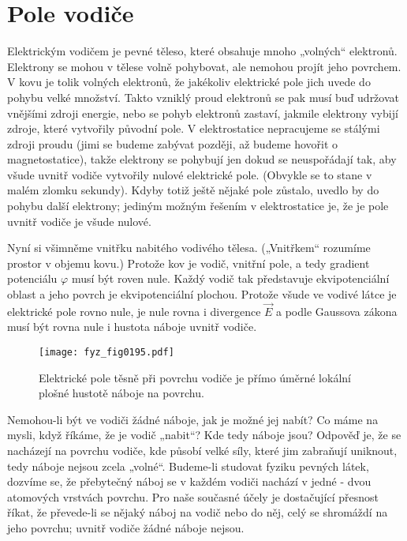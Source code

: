 \section{Pole vodiče}\label{fyz:IIchapVsecVIII}
  Elektrickým vodičem je pevné těleso, které obsahuje mnoho „volných“ elektronů. Elektrony se 
  mohou v tělese volně pohybovat, ale nemohou projít jeho povrchem. V kovu je tolik volných 
  elektronů, že jakékoliv elektrické pole jich uvede do pohybu velké množství. Takto vzniklý 
  proud elektronů se pak musí buď udržovat vnějšími zdroji energie, nebo se pohyb elektronů 
  zastaví, jakmile elektrony vybijí zdroje, které vytvořily původní pole. V elektrostatice 
  nepracujeme se stálými zdroji proudu (jimi se budeme zabývat později, až budeme hovořit o 
  magnetostatice), takže elektrony se pohybují jen dokud se neuspořádají tak, aby všude uvnitř 
  vodiče vytvořily nulové elektrické pole. (Obvykle se to stane v malém zlomku sekundy). Kdyby 
  totiž ještě nějaké pole zůstalo, uvedlo by do pohybu další elektrony; jediným možným řešením 
  v elektrostatice je, že je pole uvnitř vodiče je všude nulové.
  
  Nyní si všimněme vnitřku nabitého vodivého tělesa. („Vnitřkem“ rozumíme prostor v objemu 
  kovu.) Protože kov je vodič, vnitřní pole, a tedy gradient potenciálu \(\varphi\) musí být 
  roven nule. Každý vodič tak představuje ekvipotenciální oblast a jeho povrch je 
  ekvipotenciální plochou. Protože všude ve vodivé látce je elektrické pole rovno nule, je nule 
  rovna i divergence \(\vec{E}\) a podle Gaussova zákona musí být rovna nule i hustota náboje 
  uvnitř vodiče.

  \begin{figure}[ht!]  %
    \centering
    \texttt{[image: fyz\_fig0195.pdf]}
    \caption{Elektrické pole těsně při povrchu vodiče je přímo úměrné lokální plošné hustotě  
             náboje na povrchu.}
    \label{fyz:fig0195}
  \end{figure} 
  Nemohou-li být ve vodiči žádné náboje, jak je možné jej nabít? Co máme na mysli, když říkáme, 
  že je vodič „nabit“? Kde tedy náboje jsou? Odpověď je, že se nacházejí na povrchu vodiče, kde 
  působí velké síly, které jim zabraňují uniknout, tedy náboje nejsou zcela „volné“. Budeme-li 
  studovat fyziku pevných látek, dozvíme se, že přebytečný náboj se v každém vodiči nachází v 
  jedné - dvou atomových vrstvách povrchu. Pro naše současné účely je dostačující přesnost 
  říkat, že převede-li se nějaký náboj na vodič nebo do něj, celý se shromáždí na jeho povrchu; 
  uvnitř vodiče žádné náboje nejsou. 
  
